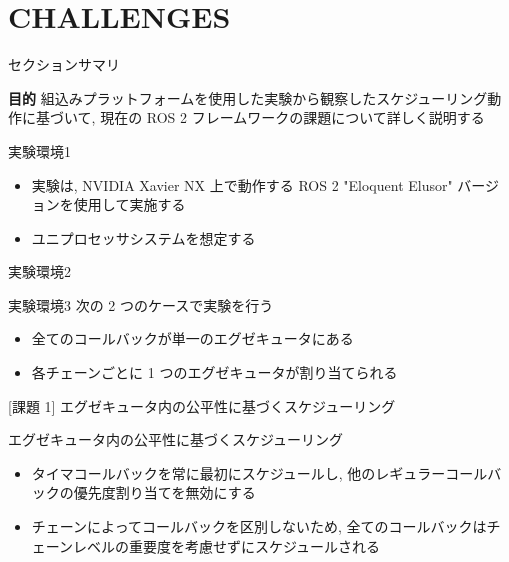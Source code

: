 
\section{CHALLENGES}
\label{sec: challenges}

\begin{frame}{セクションサマリ}
    \begin{itembox}[l]{\textbf{目的}}
        組込みプラットフォームを使用した実験から観察したスケジューリング動作に基づいて, 現在の ROS 2 フレームワークの課題について詳しく説明する
    \end{itembox}
\end{frame}

\begin{frame}{実験環境1}
    \begin{itemize}
        \item 実験は, NVIDIA Xavier NX 上で動作する ROS 2 "Eloquent Elusor" バージョンを使用して実施する
        \item ユニプロセッサシステムを想定する
    \end{itemize}
\end{frame}

\begin{frame}[label=exampleChain]{実験環境2}
\end{frame}

\begin{frame}{実験環境3}
    次の 2 つのケースで実験を行う
    \begin{itemize}
        \item 全てのコールバックが単一のエグゼキュータにある
        \item 各チェーンごとに 1 つのエグゼキュータが割り当てられる
    \end{itemize}
\end{frame}

\begin{frame}{[課題 1] エグゼキュータ内の公平性に基づくスケジューリング}
    \begin{block}{エグゼキュータ内の公平性に基づくスケジューリング}
      \setlength{\linewidth}{0.98\columnwidth}
      \begin{itemize}
        \item タイマコールバックを常に最初にスケジュールし, 他のレギュラーコールバックの優先度割り当てを無効にする
        \item チェーンによってコールバックを区別しないため, 全てのコールバックはチェーンレベルの重要度を考慮せずにスケジュールされる
      \end{itemize}
    \end{block}
\end{frame}

